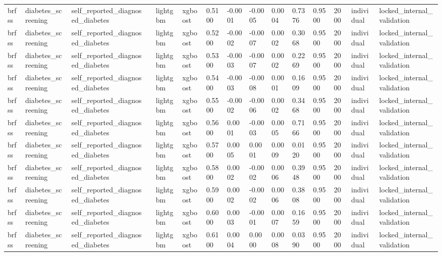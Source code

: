 \begin{tabular}{lllllllllllllll}
brfss & diabetes\_screening & self\_reported\_diagnosed\_diabetes &  & lightgbm & xgboost & 0.5100 & -0.0001 & -0.0005 & 0.0004 & 0.7376 & 0.9500 & 2000 & individual & locked\_internal\_validation \\
brfss & diabetes\_screening & self\_reported\_diagnosed\_diabetes &  & lightgbm & xgboost & 0.5200 & -0.0002 & -0.0007 & 0.0002 & 0.3068 & 0.9500 & 2000 & individual & locked\_internal\_validation \\
brfss & diabetes\_screening & self\_reported\_diagnosed\_diabetes &  & lightgbm & xgboost & 0.5300 & -0.0003 & -0.0007 & 0.0002 & 0.2269 & 0.9500 & 2000 & individual & locked\_internal\_validation \\
brfss & diabetes\_screening & self\_reported\_diagnosed\_diabetes &  & lightgbm & xgboost & 0.5400 & -0.0003 & -0.0008 & 0.0001 & 0.1609 & 0.9500 & 2000 & individual & locked\_internal\_validation \\
brfss & diabetes\_screening & self\_reported\_diagnosed\_diabetes &  & lightgbm & xgboost & 0.5500 & -0.0002 & -0.0006 & 0.0002 & 0.3468 & 0.9500 & 2000 & individual & locked\_internal\_validation \\
brfss & diabetes\_screening & self\_reported\_diagnosed\_diabetes &  & lightgbm & xgboost & 0.5600 & 0.0001 & -0.0003 & 0.0005 & 0.7166 & 0.9500 & 2000 & individual & locked\_internal\_validation \\
brfss & diabetes\_screening & self\_reported\_diagnosed\_diabetes &  & lightgbm & xgboost & 0.5700 & 0.0005 & 0.0001 & 0.0009 & 0.0120 & 0.9500 & 2000 & individual & locked\_internal\_validation \\
brfss & diabetes\_screening & self\_reported\_diagnosed\_diabetes &  & lightgbm & xgboost & 0.5800 & 0.0002 & -0.0002 & 0.0006 & 0.3948 & 0.9500 & 2000 & individual & locked\_internal\_validation \\
brfss & diabetes\_screening & self\_reported\_diagnosed\_diabetes &  & lightgbm & xgboost & 0.5900 & 0.0002 & -0.0002 & 0.0006 & 0.3808 & 0.9500 & 2000 & individual & locked\_internal\_validation \\
brfss & diabetes\_screening & self\_reported\_diagnosed\_diabetes &  & lightgbm & xgboost & 0.6000 & 0.0003 & -0.0001 & 0.0007 & 0.1659 & 0.9500 & 2000 & individual & locked\_internal\_validation \\
brfss & diabetes\_screening & self\_reported\_diagnosed\_diabetes &  & lightgbm & xgboost & 0.6100 & 0.0004 & 0.0000 & 0.0008 & 0.0390 & 0.9500 & 2000 & individual & locked\_internal\_validation \\

\end{tabular}
